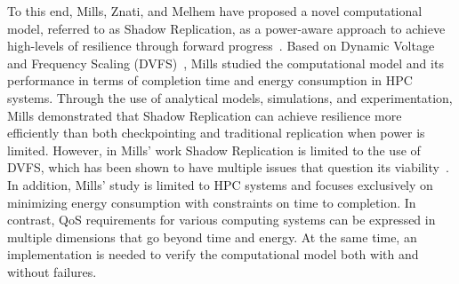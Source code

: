 To this end, Mills, Znati, and Melhem have proposed a novel computational model, referred to as Shadow Replication, as a  
power-aware approach to achieve high-levels of resilience through forward progress~\cite{mills_2014_icnc,mills_2014_pdp,mills2014power}. Based on Dynamic Voltage and Frequency Scaling (DVFS)~\cite{Orgerie:2014:STI:2597757.2532637,4658633,LeSueur:2010:DVF:1924920.1924921}, Mills studied the computational model and its performance in terms of completion time and energy consumption in HPC systems. Through the use of analytical models, simulations, and experimentation, Mills demonstrated that Shadow Replication can achieve resilience more efficiently than both checkpointing and traditional replication when power is limited. However, in Mills' work Shadow Replication is limited to the use of DVFS, which has been shown to have multiple issues that question its viability~\cite{Eyerman:2011:FDU:1952998.1952999,Keller:EECS-2015-257,chandra2008defect,zhao2008reliability}. In addition, Mills' study is limited to HPC systems and focuses exclusively on minimizing energy consumption with constraints on time to completion. In contrast, QoS requirements for various computing systems can be expressed in multiple dimensions that go beyond time and energy. At the same time, an implementation is needed to verify the computational model both with and without failures. 




